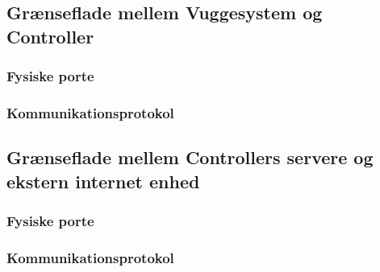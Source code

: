 \subsection{Grænseflade mellem Vuggesystem og Controller}
\subsubsection*{Fysiske porte}

\subsubsection*{Kommunikationsprotokol}

\subsection{Grænseflade mellem Controllers servere og ekstern internet enhed}
\subsubsection*{Fysiske porte}

\subsubsection*{Kommunikationsprotokol}